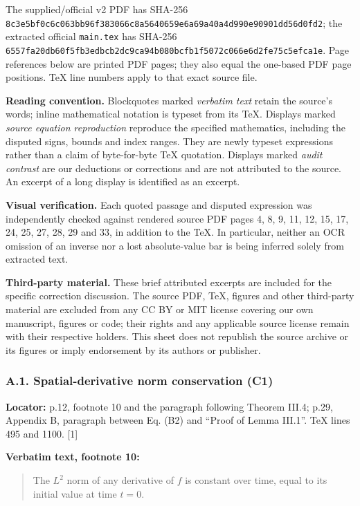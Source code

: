 The supplied/official v2 PDF has SHA-256
\nolinkurl{8c3e5bf0c6c063bb96f383066c8a5640659e6a69a40a4d990e90901dd56d0fd2};
the extracted official \nolinkurl{main.tex} has SHA-256
\nolinkurl{6557fa20db60f5fb3edbcb2dc9ca94b080bcfb1f5072c066e6d2fe75c5efca1e}.
Page references below are printed PDF pages; they also equal the
one-based PDF page positions. TeX line numbers apply to that exact
source file.

\textbf{Reading convention.} Blockquotes marked \emph{verbatim text}
retain the source's words; inline mathematical notation is typeset from
its TeX. Displays marked \emph{source equation reproduction} reproduce
the specified mathematics, including the disputed signs, bounds and
index ranges. They are newly typeset expressions rather than a claim of
byte-for-byte TeX quotation. Displays marked \emph{audit contrast} are
our deductions or corrections and are not attributed to the source. An
excerpt of a long display is identified as an excerpt.

\textbf{Visual verification.} Each quoted passage and disputed
expression was independently checked against rendered source PDF pages
4, 8, 9, 11, 12, 15, 17, 24, 25, 27, 28, 29 and 33, in addition to the
TeX. In particular, neither an OCR omission of an inverse nor a lost
absolute-value bar is being inferred solely from extracted text.

\textbf{Third-party material.} These brief attributed excerpts are
included for the specific correction discussion. The source PDF, TeX,
figures and other third-party material are excluded from any CC BY or
MIT license covering our own manuscript, figures or code; their rights
and any applicable source license remain with their respective holders.
This sheet does not republish the source archive or its figures or imply
endorsement by its authors or publisher.

\subsubsection{A.1. Spatial-derivative norm conservation
(C1)}\label{a.1.-spatial-derivative-norm-conservation-c1}

\textbf{Locator:} p.12, footnote 10 and the paragraph following Theorem
III.4; p.29, Appendix B, paragraph between Eq. (B2) and ``Proof of Lemma
III.1''. TeX lines 495 and 1100. {[}1{]}

\textbf{Verbatim text, footnote 10:}

\begin{quote}
The \(L^2\) norm of any derivative of \(f\) is constant over time, equal
to its initial value at time \(t=0\).
\end{quote}

